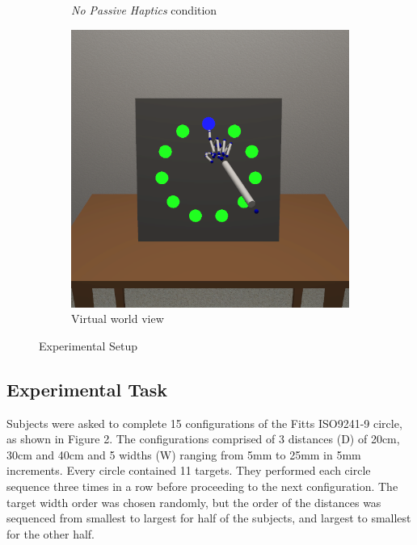 \documentclass[]{aiaa-tc}%
\begin{document}
\begin{figure}[tb]
\begin{subfigure}{.32\textwidth}
    \caption{\textit{No Passive Haptics} condition}
    \label{fig:no_passive_haptics}
  \end{subfigure}
  \begin{subfigure}{.32\textwidth}
    \centering
    \includegraphics[width=.99\linewidth]{figures/virtual_view.png}
    \caption{Virtual world view}
    \label{fig:virtual_view}
  \end{subfigure}
  \caption{Experimental Setup}
\end{figure}

\subsection{Experimental Task}
Subjects were asked to complete 15 configurations of the Fitts ISO9241-9 circle, as shown in Figure 2.
The configurations comprised of 3 distances (D) of 20cm, 30cm and 40cm and 5 widths (W) ranging from 5mm to 25mm in 5mm increments.
Every circle contained 11 targets.
They performed each circle sequence three times in a row before proceeding to the next configuration.
The target width order was chosen randomly, but the order of the distances was sequenced from smallest to largest for half of the subjects, and largest to smallest for the other half.
\end{document}
